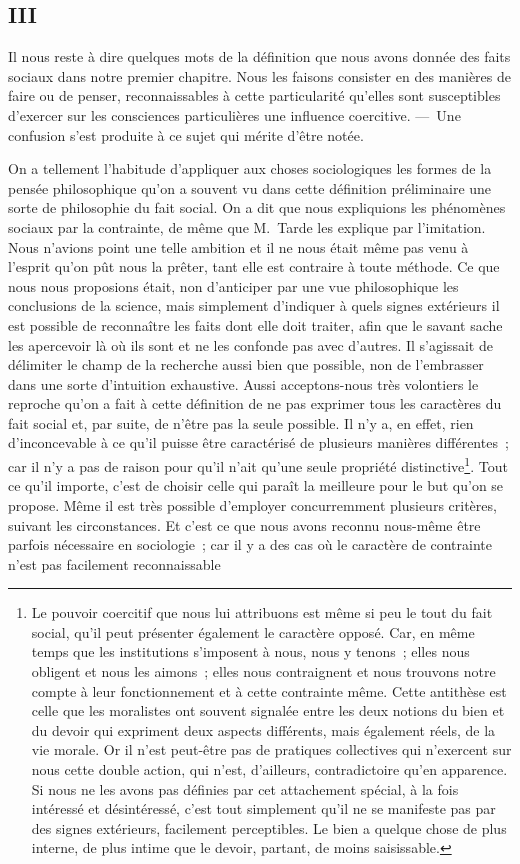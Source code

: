 \documentclass[french,twoside]{book} %
\begin{document}
\subsection[{III}]{III}
\noindent Il nous reste à dire quelques mots de la définition que nous avons donnée des faits sociaux dans notre premier chapitre. Nous les faisons consister en des manières de faire ou de penser, reconnaissables à cette particularité qu’elles sont susceptibles d’exercer sur les consciences particulières une influence coercitive. — Une confusion s’est produite à ce sujet qui mérite d’être notée.\par
On a tellement l’habitude d’appliquer aux choses sociologiques les formes de la pensée philosophique qu’on a souvent vu dans cette définition préliminaire une sorte de philosophie du fait social. On a dit que nous expliquions les phénomènes sociaux par la contrainte, de même que M. Tarde les explique par l’imitation. Nous n’avions point une telle ambition et il ne nous était même pas venu à l’esprit qu’on pût nous la prêter, tant elle est contraire à toute méthode. Ce que nous nous proposions était, non d’anticiper par une vue philosophique les conclusions de la science, mais simplement d’indiquer à quels signes extérieurs il est possible de reconnaître les faits dont elle doit traiter, afin que le savant sache les apercevoir là où ils sont et ne les confonde pas avec d’autres. Il s’agissait de délimiter le champ de la recherche aussi bien que possible, non de l’embrasser dans une sorte d’intuition exhaustive. Aussi acceptons-nous très volontiers le reproche qu’on a fait à cette définition de ne pas exprimer tous les caractères du fait social et, par suite, de n’être pas la seule possible. Il n’y a, en effet, rien d’inconcevable à ce qu’il puisse être caractérisé de plusieurs manières différentes ; car il n’y a pas de raison pour qu’il n’ait qu’une seule propriété distinctive\footnote{ Le pouvoir coercitif que nous lui attribuons est même si peu le tout du fait social, qu’il peut présenter également le caractère opposé. Car, en même temps que les institutions s’imposent à nous, nous y tenons ; elles nous obligent et nous les aimons ; elles nous contraignent et nous trouvons notre compte à leur fonctionnement et à cette contrainte même. Cette antithèse est celle que les moralistes ont souvent signalée entre les deux notions du bien et du devoir qui expriment deux aspects différents, mais également réels, de la vie morale. Or il n’est peut-être pas de pratiques collectives qui n’exercent sur nous cette double action, qui n’est, d’ailleurs, contradictoire qu’en apparence. Si nous ne les avons pas définies par cet attachement spécial, à la fois intéressé et désintéressé, c’est tout simplement qu’il ne se manifeste pas par des signes extérieurs, facilement perceptibles. Le bien a quelque chose de plus interne, de plus intime que le devoir, partant, de moins saisissable.}. Tout ce qu’il importe, c’est de choisir celle qui paraît la meilleure pour le but qu’on se propose. Même il est très possible d’employer concurremment plusieurs critères, suivant les circonstances. Et c’est ce que nous avons reconnu nous-même être parfois nécessaire en sociologie ; car il y a des cas où le caractère de contrainte n’est pas facilement reconnaissable 
\end{document}
